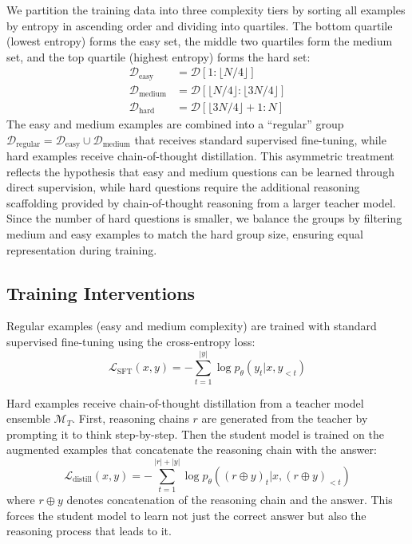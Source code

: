 We partition the training data into three complexity tiers by sorting all examples by entropy in ascending order and dividing into quartiles. The bottom quartile (lowest entropy) forms the easy set, the middle two quartiles form the medium set, and the top quartile (highest entropy) forms the hard set:
\begin{align}
    \mathcal{D}_{\text{easy}} &= \mathcal{D}[1 : \lfloor N/4 \rfloor] \\
    \mathcal{D}_{\text{medium}} &= \mathcal{D}[\lfloor N/4 \rfloor : \lfloor 3N/4 \rfloor] \\
    \mathcal{D}_{\text{hard}} &= \mathcal{D}[\lfloor 3N/4 \rfloor + 1 : N]
\end{align}
The easy and medium examples are combined into a ``regular'' group $\mathcal{D}_{\text{regular}} = \mathcal{D}_{\text{easy}} \cup \mathcal{D}_{\text{medium}}$ that receives standard supervised fine-tuning, while hard examples receive chain-of-thought distillation. This asymmetric treatment reflects the hypothesis that easy and medium questions can be learned through direct supervision, while hard questions require the additional reasoning scaffolding provided by chain-of-thought reasoning from a larger teacher model. Since the number of hard questions is smaller, we balance the groups by filtering medium and easy examples to match the hard group size, ensuring equal representation during training.

\subsection{Training Interventions}

Regular examples (easy and medium complexity) are trained with standard supervised fine-tuning using the cross-entropy loss:
\begin{equation}
    \mathcal{L}_{\text{SFT}}(x, y) = -\sum_{t=1}^{|y|} \log p_\theta(y_t | x, y_{<t})
\end{equation}

Hard examples receive chain-of-thought distillation from a teacher model ensemble $\mathcal{M}_T$. First, reasoning chains $r$ are generated from the teacher by prompting it to think step-by-step. Then the student model is trained on the augmented examples that concatenate the reasoning chain with the answer:
\begin{equation}
    \mathcal{L}_{\text{distill}}(x, y) = -\sum_{t=1}^{|r|+|y|} \log p_\theta((r \oplus y)_t | x, (r \oplus y)_{<t})
\end{equation}
where $r \oplus y$ denotes concatenation of the reasoning chain and the answer. This forces the student model to learn not just the correct answer but also the reasoning process that leads to it.

